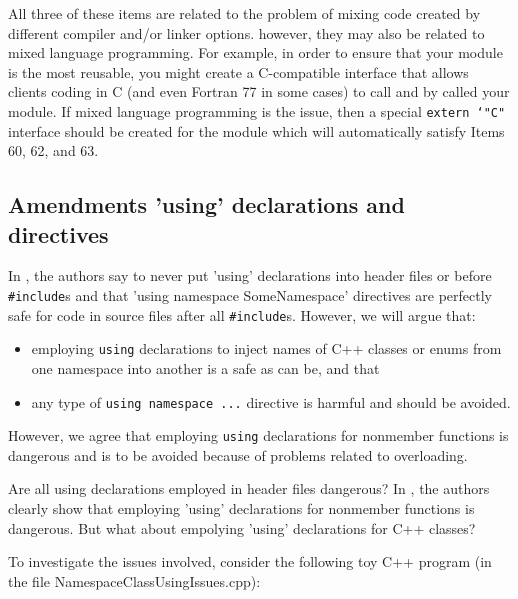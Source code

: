 All three of these items are related to the problem of mixing code created by
different compiler and/or linker options.  however, they may also be related
to mixed language programming.  For example, in order to ensure that your
module is the most reusable, you might create a C-compatible interface that
allows clients coding in C (and even Fortran 77 in some cases) to call and by
called your module.  If mixed language programming is the issue, then a
special {}\texttt{extern `"C"} interface should be created for the module
which will automatically satisfy Items 60, 62, and 63.

%
\subsection{Amendments 'using' declarations and directives}
%

In {}\cite[Item 59]{C++CodingStandards05}, the authors say to never put
'using' declarations into header files or before {}\texttt{\#include}s and
that 'using namespace SomeNamespace' directives are perfectly safe for code in
source files after all {}\texttt{\#include}s.  However, we will argue that:

\begin{itemize}

{}\item{}employing {}\texttt{using} declarations to inject names of C++
classes or enums from one namespace into another is a safe as can be, and that

{}\item{}any type of {}\texttt{using namespace ...} directive is harmful and
should be avoided.

\end{itemize}

{}\noindent{}However, we agree that employing {}\texttt{using} declarations
for nonmember functions is dangerous and is to be avoided because of problems
related to overloading.

Are all using declarations employed in header files dangerous?  In
{}\cite[Item 59]{C++CodingStandards05}, the authors clearly show that
employing 'using' declarations for nonmember functions is dangerous.  But what
about empolying 'using' declarations for C++ classes?

To investigate the issues involved, consider the following toy C++ program (in
the file NamespaceClassUsingIssues.cpp):

